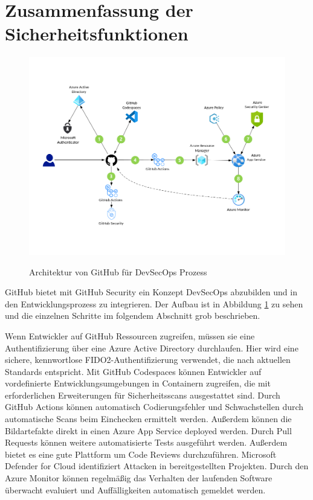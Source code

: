 \section{Zusammenfassung der Sicherheitsfunktionen}
\begin{figure}[H]
	{\caption{Architektur von GitHub für DevSecOps Prozess}
		\label{FIG:devsecops-in-github}}
	{\includegraphics[width=1\textwidth]{figures/devsecops-in-github.png}}
\end{figure}
GitHub bietet mit GitHub Security ein Konzept DevSecOps abzubilden und in den Entwicklungsprozess zu integrieren. Der Aufbau ist in Abbildung \ref{FIG:devsecops-in-github} zu sehen und die einzelnen Schritte im folgendem Abschnitt grob beschrieben.

Wenn Entwickler auf GitHub Ressourcen zugreifen, müssen sie eine Authentifizierung über eine Azure Active Directory durchlaufen. Hier wird eine sichere, kennwortlose  FIDO2-Authentifizierung verwendet, die nach aktuellen Standards entspricht. \cite{mic-fido2}
Mit GitHub Codespaces können Entwickler auf vordefinierte Entwicklungsumgebungen in Containern zugreifen, die mit erforderlichen Erweiterungen für Sicherheitsscans ausgestattet sind.
Durch GitHub Actions können automatisch Codierungsfehler und Schwachstellen durch automatische Scans beim Einchecken ermittelt werden.
Außerdem können die Bildartefakte direkt in einen Azure App Service deployed werden.
Durch Pull Requests können weitere automatisierte Tests ausgeführt werden. Außerdem bietet es eine gute Plattform um Code Reviews durchzuführen.
Microsoft Defender for Cloud identifiziert Attacken in bereitgestellten Projekten.
Durch den Azure Monitor können regelmäßig das Verhalten der laufenden Software überwacht evaluiert und Auffälligkeiten automatisch gemeldet werden.\cite{mic-devsecops-github}

